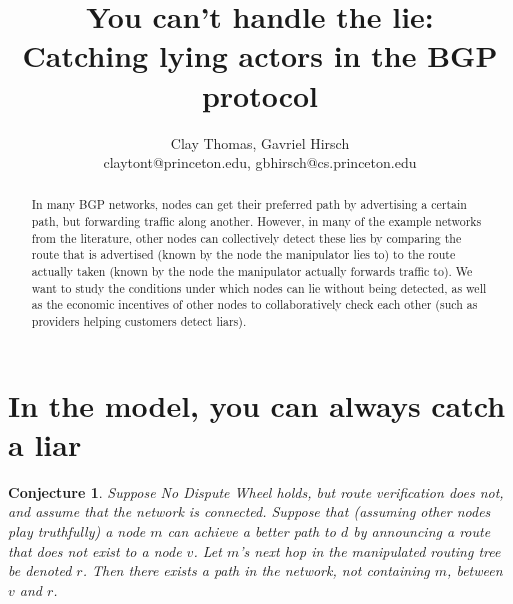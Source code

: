 \documentclass[12pt]{article}
\newtheorem{conjecture}{Conjecture}
\begin{document}
 
\title{You can't handle the lie: \\
  Catching lying actors in the BGP protocol }
\author{Clay Thomas, Gavriel Hirsch\\
claytont@princeton.edu, gbhirsch@cs.princeton.edu }
\maketitle

\begin{abstract}
  In many BGP networks, nodes can get their preferred path
  by advertising a certain path, but forwarding traffic along another.
  However, in many of the example networks from the literature,
  other nodes can collectively detect these lies
  by comparing the route that is advertised (known by the node
  the manipulator lies to)
  to the route actually taken
  (known by the node the manipulator actually forwards traffic to).
  We want to study the conditions under which nodes
  can lie without being detected,
  as well as the economic incentives of other nodes to collaboratively
  check each other (such as providers helping customers detect liars).
\end{abstract}

\section{In the \cite{RoutingGames} model, you can always catch a liar}

  \begin{conjecture}
    Suppose No Dispute Wheel holds, but route verification does not, and
    assume that the network is connected.
    Suppose that (assuming other nodes play truthfully)
    a node $m$ can achieve a better path to $d$ by announcing
    a route that does not exist to a node $v$.
    Let $m$'s next hop in the manipulated routing tree be denoted $r$.
    Then there exists a path in the network, not containing $m$,
    between $v$ and $r$.
  \end{conjecture}
\end{document}
